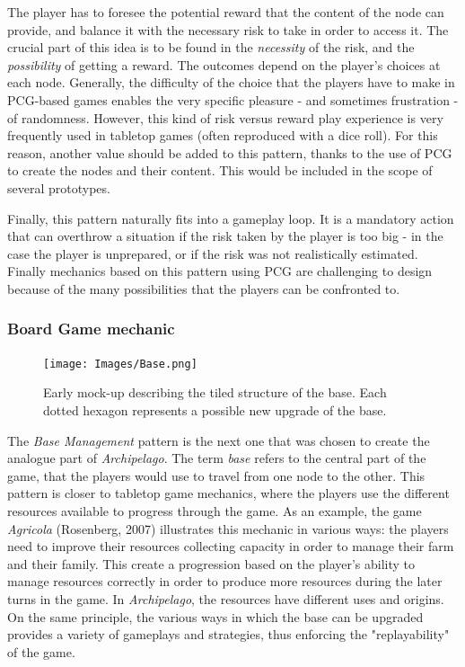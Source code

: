 The player has to foresee the potential reward that the content of the node can provide, and balance it with the necessary risk to take in order to access it. The crucial part of this idea is to be found in the \textit{necessity} of the risk, and the \textit{possibility} of getting a reward. The outcomes depend on the player's choices at each node. Generally, the difficulty of the choice that the players have to make in PCG-based games enables the very specific pleasure - and sometimes frustration - of randomness. However, this kind of risk versus reward play experience is very frequently used in tabletop games (often reproduced with a dice roll). For this reason, another value should be added to this pattern, thanks to the use of PCG to create the nodes and their content. This would be included in the scope of several prototypes.

Finally, this pattern naturally fits into a gameplay loop. It is a mandatory action that can overthrow a situation if the risk taken by the player is too big - in the case the player is unprepared, or if the risk was not realistically estimated. Finally mechanics based on this pattern using PCG are challenging to design because of the many possibilities that the players can be confronted to. 
\subsubsection{Board Game mechanic}
\begin{figure}[h]
    \centering
    \texttt{[image: Images/Base.png]}
    \caption{Early mock-up describing the tiled structure of the base. Each dotted hexagon represents a possible new upgrade of the base.}
    \label{fig:base}
\end{figure}
The \textit{Base Management} pattern is the next one that was chosen to create the analogue part of \textit{Archipelago}. The term \textit{base} refers to the central part of the game, that the players would use to travel from one node to the other. This pattern is closer to tabletop game mechanics, where the players use the different resources available to progress through the game. As an example, the game \textit{Agricola} (Rosenberg, 2007) \cite{game:agri} illustrates this mechanic in various ways: the players need to improve their resources collecting capacity in order to manage their farm and their family. This create a progression based on the player's ability to manage resources correctly in order to produce more resources during the later turns in the game. In \textit{Archipelago}, the resources have different uses and origins. On the same principle, the various ways in which the base can be upgraded provides a variety of gameplays and strategies, thus enforcing the "replayability" of the game.

